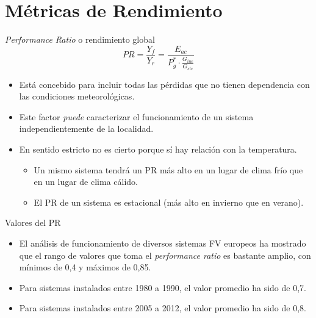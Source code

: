 \documentclass[aspectratio=169, usenames,svgnames,dvipsnames]{beamer}
\begin{document}
\section{Métricas de Rendimiento}
\label{sec:org2b073f8}

\begin{frame}[label={sec:orgcb3fd77}]{\emph{Performance Ratio} o rendimiento global}
\[
  PR = \frac{Y_f}{Y_r} = \frac{E_{ac}}{P_g^* \cdot \frac{G_{inc}}{G_{stc}}}
\]

\begin{itemize}
\item Está concebido para incluir todas las \alert{pérdidas que no tienen
dependencia con las condiciones meteorológicas}.

\item Este factor \emph{puede} caracterizar el funcionamiento de un sistema
\alert{independientemente de la localidad}.

\item En sentido estricto no es cierto porque sí hay \alert{relación con la temperatura}.

\begin{itemize}
\item Un mismo sistema tendrá un PR más alto en un lugar de clima frío que en un lugar de clima cálido.

\item El PR de un sistema es estacional (más alto en invierno que en verano).
\end{itemize}
\end{itemize}
\end{frame}

\begin{frame}[label={sec:org61d8cc9}]{Valores del PR}
\begin{itemize}
\item El análisis de funcionamiento de diversos sistemas FV europeos ha
mostrado que el rango de valores que toma el \emph{performance ratio} es
bastante amplio, con mínimos de 0,4 y máximos de 0,85.

\item Para sistemas instalados entre 1980 a 1990, \alert{el valor promedio ha sido de
0,7}.

\item Para sistemas instalados entre 2005 a 2012, \alert{el valor promedio ha
sido de 0,8}.
\end{itemize}
\end{frame}
\end{document}
